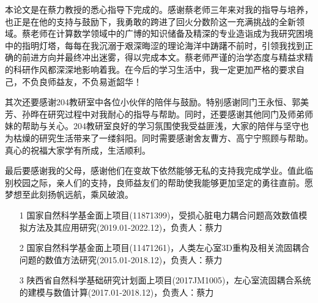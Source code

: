 \documentclass[twoside,UTF8]{nputhesis}
\begin{document}
本论文是在蔡力教授的悉心指导下完成的。感谢蔡老师三年来对我的指导与培养，也正是在他的支持与鼓励下，我勇敢的跨进了回火分数阶这一充满挑战的全新领域。蔡老师在计算数学领域中的广博的知识储备及精深的专业造诣成为我研究困境中的指明灯塔，每每在我沉溺于艰深晦涩的理论海洋中踌躇不前时，引领我找到正确的前进方向并最终冲出迷雾，得以完成本文。蔡老师严谨的治学态度与精益求精的科研作风都深深地影响着我。在今后的学习生活中，我一定更加严格的要求自己，不负良师益友，不负易逝韶华！

其次还要感谢204教研室中各位小伙伴的陪伴与鼓励。特别感谢同门王永恒、郭美芳、孙晔在研究过程中对我耐心的指导与帮助。同时，还要感谢其他同门及师弟师妹的帮助与关心。204教研室良好的学习氛围使我受益匪浅，大家的陪伴与坚守也为枯燥的研究生活带来了一缕斜阳。同时需要感谢舍友曹方、高宁宁照顾与帮助。真心的祝福大家学有所成，生活顺利。

最后要感谢我的父母，感谢他们在变故下依然能够无私的支持我完成学业。值此临别校园之际，亲人们的支持，良师益友们的帮助使我能够更加坚定的勇往直前。愿梦想至此刻扬帆远航，乘风破浪。


\Work

\begin{itemize}

\item[1] 国家自然科学基金面上项目(11871399)，受损心脏电力耦合问题高效数值模拟方法及其应用研究(2019.01-2022.12)，负责人：蔡力
\item[2] 国家自然科学基金面上项目(11471261)，人类左心室3D重构及相关流固耦合问题的数值方法研究(2015.01-2018.12)，负责人：蔡力
\item[3] 陕西省自然科学基础研究计划面上项目(2017JM1005)，左心室流固耦合系统的建模与数值计算(2017.01-2018.12)，负责人：蔡力
\end{itemize}

\statement
\end{document}
